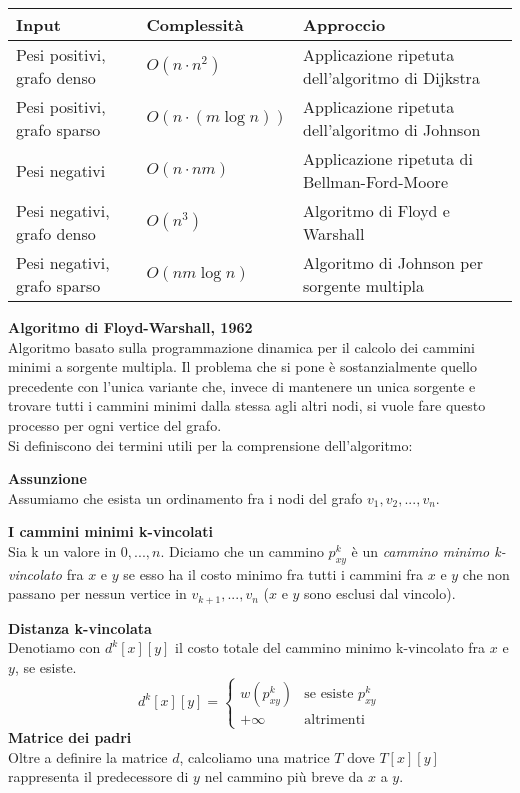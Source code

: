 \documentclass[../cheatSheetAlgoritmi.tex]{subfiles}
\begin{document}
\bigskip
\begin{tabular}{@{}lll@{}}
\toprule
Input & Complessità & Approccio  \\ \midrule

Pesi positivi, grafo denso       &  $O(n \cdot n^2)$ & Applicazione ripetuta dell’algoritmo di Dijkstra   \\

Pesi positivi, grafo sparso        &  $O(n \cdot (m \log n))$ &  Applicazione ripetuta dell’algoritmo di Johnson   \\

Pesi negativi &  $O(n \cdot nm)$ & Applicazione ripetuta di Bellman-Ford-Moore  \\

Pesi negativi, grafo denso &  $O(n^3)$ & Algoritmo di Floyd e Warshall   \\

Pesi negativi, grafo sparso               & $O(nm \log n)$ & Algoritmo di Johnson per sorgente multipla    \\ \bottomrule
\end{tabular}

\bigskip
\bigskip
\textbf{Algoritmo di Floyd-Warshall, 1962} \\
Algoritmo basato sulla programmazione dinamica per il calcolo dei cammini minimi a sorgente multipla. Il problema che si pone è sostanzialmente quello precedente con l'unica variante che, invece di mantenere un unica sorgente e trovare tutti i cammini minimi dalla stessa agli altri nodi, si vuole fare questo processo per ogni vertice del grafo.  \\
Si definiscono dei termini utili per la comprensione dell'algoritmo:

\bigskip
\textbf{Assunzione}  \\
Assumiamo che esista un ordinamento fra i nodi del grafo $v_1 , v_2 , ... , v_n$.

\bigskip
\textbf{I cammini minimi k-vincolati} \\
Sia k un valore in ${0, ...,  n}$. Diciamo che un cammino $p^{k}_{xy}$ è un
\emph{cammino minimo k-vincolato} fra $x$ e $y$ se esso ha il costo minimo fra tutti i cammini fra $x$ e $y$ che non passano per nessun vertice in $v_{k+1} , . . . , v_n$ ($x$ e $y$ sono esclusi dal vincolo).

\bigskip
\textbf{Distanza k-vincolata} \\
Denotiamo con $d^{k}[x][y]$ il costo totale del cammino minimo k-vincolato fra $x$ e $y$, se esiste.
\[
  d^{k}[x][y]=\begin{cases}
               w(p^{k}_{xy}) & \text{se esiste }p^{k}_{xy}\\
               +\infty & \text{altrimenti}
            \end{cases}
\]
\textbf{Matrice dei padri} \\
Oltre a definire la matrice $d$, calcoliamo una matrice $T$ dove $T[x][y]$ rappresenta il predecessore di $y$ nel cammino più breve da $x$ a $y$.
\end{document}
